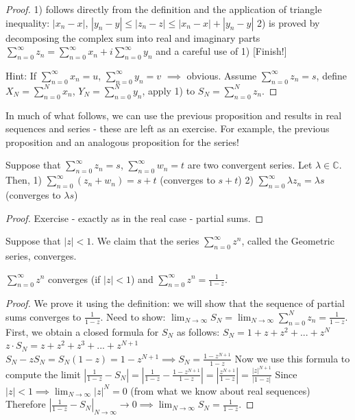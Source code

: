\documentclass[12pt]{article}
\begin{document}
\begin{proof}
1) follows directly from the definition and the application of triangle inequality: $|x_n - x|$, $|y_n - y| \leq |z_n - z| \leq |x_n - x| + |y_n - y|$
2) is proved by decomposing the complex sum into real and imaginary parts $\sum_{n=0}^\infty z_n = \sum_{n=0}^\infty x_n + i\sum_{n=0}^\infty y_n$ and a careful use of 1) [Finish!]

Hint: If $\sum_{n=0}^\infty x_n = u$, $\sum_{n=0}^\infty y_n = v$ $\implies$ obvious. Assume $\sum_{n=0}^\infty z_n = s$, define $X_N = \sum_{n=0}^N x_n$, $Y_N = \sum_{n=0}^N y_n$, apply 1) to $S_N = \sum_{n=0}^N z_n$.
\end{proof}

In much of what follows, we can use the previous proposition and results in real sequences and series - these are left as an exercise. For example, the previous proposition and an analogous proposition for the series!

\begin{proposition}
Suppose that $\sum_{n=0}^\infty z_n = s$, $\sum_{n=0}^\infty w_n = t$ are two convergent series. Let $\lambda \in \mathbb{C}$. Then,
1) $\sum_{n=0}^\infty (z_n + w_n) = s+t$ (converges to $s+t$)
2) $\sum_{n=0}^\infty \lambda z_n = \lambda s$ (converges to $\lambda s$)
\end{proposition}
\begin{proof}
Exercise - exactly as in the real case - partial sums.
\end{proof}

\begin{example}
Suppose that $|z| < 1$.
We claim that the series $\sum_{n=0}^\infty z^n$, called the Geometric series, converges.
\end{example}

\begin{proposition}
$\sum_{n=0}^\infty z^n$ converges (if $|z| < 1$) and $\sum_{n=0}^\infty z^n = \frac{1}{1-z}$.
\end{proposition}

\begin{proof}
We prove it using the definition: we will show that the sequence of partial sums converges to $\frac{1}{1-z}$.
Need to show: $\lim_{N\to\infty} S_N = \lim_{N\to\infty} \sum_{n=0}^N z_n = \frac{1}{1-z}$.
First, we obtain a closed formula for $S_N$ as follows:
$S_N = 1 + z + z^2 + ... + z^N$
$z \cdot S_N = z + z^2 + z^3 + ... + z^{N+1}$
$S_N - zS_N = S_N(1-z) = 1 - z^{N+1} \implies S_N = \frac{1-z^{N+1}}{1-z}$
Now we use this formula to compute the limit
$|\frac{1}{1-z} - S_N| = |\frac{1}{1-z} - \frac{1-z^{N+1}}{1-z}| = |\frac{z^{N+1}}{1-z}| = \frac{|z|^{N+1}}{|1-z|}$
Since $|z| < 1 \implies \lim_{N\to\infty} |z|^N = 0$ (from what we know about real sequences)
Therefore $|\frac{1}{1-z} - S_N|_{N\to\infty} \to 0 \implies \lim_{N\to\infty} S_N = \frac{1}{1-z}$.
\end{proof}
\end{document}
